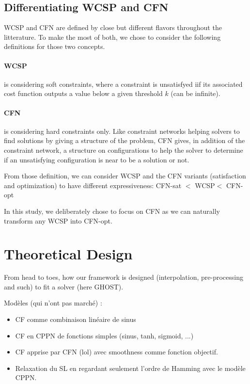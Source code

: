 \documentclass[letterpaper]{article} %
\newcommand{\cfn}{\textsc{CFN}\xspace}
\newcommand{\wcsp}{\textsc{WCSP}\xspace}
\begin{document}
\subsection{Differentiating \wcsp and \cfn}
\wcsp and \cfn are defined by close but different flavors throughout the litterature. To make the most of both, we chose to consider the following definitions for those two concepts.

\paragraph{\wcsp} is  considering soft  constraints, where  a constraint  is
  unsatisfyed iif its associated cost function outputs a value below a
  given threshold $k$ (can be infinite).

\paragraph{\cfn} is  considering  hard constraints  only.  Like  constraint
  networks helping solvers to find  solutions by giving a structure of
  the problem,  CFN gives,  in addition of  the constraint  network, a
  structure on  configurations to help  the solver to determine  if an
  unsatisfying configuration is near to be a solution or not.

From those definition, we can consider \wcsp and the \cfn variants (satisfaction and optimization) to have different expressiveness: \cfn-sat $<$ \wcsp $<$ \cfn-opt

In this study, we deliberately chose to focus on \cfn as we can naturally transform any \wcsp into \cfn-opt.

\section{Theoretical Design}\label{sec:theory}
From head to toes, how our framework is designed (interpolation, pre-processing and such) to fit a solver (here GHOST).

Modèles (qui n'ont pas marché) :
\begin{itemize}
\item CF comme combinaison linéaire de sinus
\item CF en CPPN de fonctions simples (sinus, tanh, sigmoid, ...)
\item CF apprise par CFN (lol) avec smoothness comme fonction objectif.
\item Relaxation du SL en regardant seulement l'ordre de Hamming avec le modèle CPPN.
\end{itemize}
\end{document}
